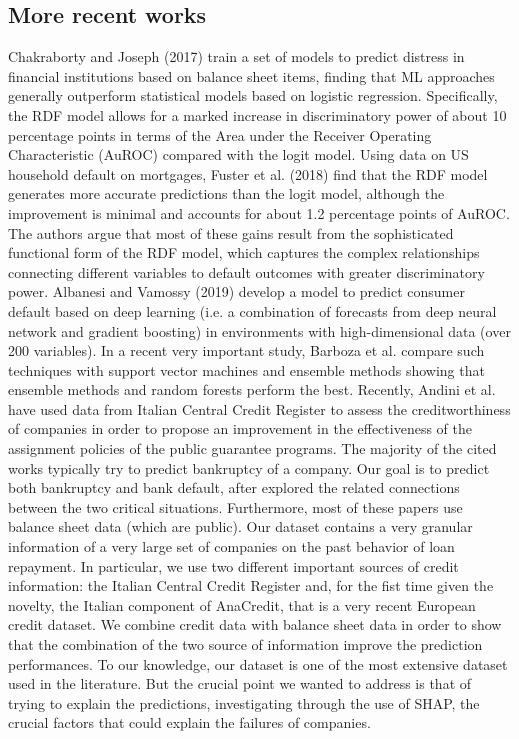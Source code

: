 \subsection{More recent works}

Chakraborty and Joseph (2017) train a set of models to predict distress in financial institutions based on balance sheet items, finding that ML approaches generally outperform statistical models based on logistic regression. Specifically, the RDF model allows for a marked increase in discriminatory power of about 10 percentage points in terms of the Area under the Receiver Operating Characteristic (AuROC) compared with the logit model.
Using data on US household default on mortgages, Fuster et al. (2018) find that the RDF model generates more accurate predictions than the logit model, although the improvement is minimal and accounts for about 1.2 percentage points of AuROC. The authors argue that most of these gains result from the sophisticated functional form of the RDF model, which captures the complex relationships connecting different variables to default outcomes with greater discriminatory power. 
Albanesi and Vamossy (2019) develop a model to predict consumer default based on deep learning (i.e. a combination of forecasts from deep neural network and gradient boosting) in environments with high-dimensional data (over 200 variables).
In a recent very important study, Barboza et al. \cite{altman-bankruptcy-17} compare such techniques with support vector machines and ensemble methods showing that ensemble methods and random forests perform the best.
Recently, Andini et al. ~\cite{andini-19} have used data from Italian Central Credit Register to assess the creditworthiness of companies in order to propose an improvement in the effectiveness of the assignment policies of the public guarantee programs.
The majority of the cited works typically try to predict bankruptcy of a company. Our goal is to predict both bankruptcy and bank default, after  explored the related connections between the two critical situations. Furthermore, most of these papers use balance sheet data (which are public). Our dataset contains a very granular information of a very large set of companies on the past behavior of loan repayment. In particular, we use two different important sources of credit information: the Italian Central Credit Register and, for the fist time given the novelty, the Italian component of AnaCredit, that is a very recent European credit dataset. We combine credit data with balance sheet data in order to show that the combination of the two source of information improve the prediction performances.
To our knowledge, our dataset is one of the most
extensive dataset used in the literature.
But the crucial point we wanted to address is that of trying to explain the predictions, investigating through the use of SHAP, the crucial factors that could explain the failures of companies.








